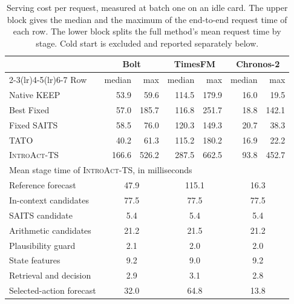 \documentclass{article}
\newcommand{\introact}{\textsc{IntroAct-TS}}
\begin{document}
\begin{table}[htbp]
  \caption{Serving cost per request, measured at batch one on an idle card. The upper block
  gives the median and the maximum of the end-to-end request time of each row. The lower block
  splits the full method's mean request time by stage. Cold start is excluded and reported
  separately below.}
  \label{tab:app-cost}
  \centering
  \small
  \setlength{\tabcolsep}{5pt}
  \begin{tabular*}{\textwidth}{@{\extracolsep{\fill}}lrrrrrr@{}}
    \toprule
    & \multicolumn{2}{c}{Bolt} & \multicolumn{2}{c}{TimesFM} & \multicolumn{2}{c}{Chronos-2} \\
    \cmidrule(lr){2-3}\cmidrule(lr){4-5}\cmidrule(lr){6-7}
    Row & median & max & median & max & median & max \\
    \midrule
    Native KEEP & 53.9 & 59.6 & 114.5 & 179.9 & 16.0 & 19.5 \\
    Best Fixed & 57.0 & 185.7 & 116.8 & 251.7 & 18.8 & 142.1 \\
    Fixed SAITS & 58.5 & 76.0 & 120.3 & 149.3 & 20.7 & 38.3 \\
    TATO & 40.2 & 61.3 & 115.2 & 180.2 & 16.9 & 22.2 \\
    \rowcolor{bestgray}\introact{} & 166.6 & 526.2 & 287.5 & 662.5 & 93.8 & 452.7 \\
    \midrule
    \multicolumn{7}{l}{Mean stage time of \introact{}, in milliseconds} \\
    Reference forecast & \multicolumn{2}{c}{47.9} & \multicolumn{2}{c}{115.1} & \multicolumn{2}{c}{16.3} \\
    In-context candidates & \multicolumn{2}{c}{77.5} & \multicolumn{2}{c}{77.5} & \multicolumn{2}{c}{77.5} \\
    SAITS candidate & \multicolumn{2}{c}{5.4} & \multicolumn{2}{c}{5.4} & \multicolumn{2}{c}{5.4} \\
    Arithmetic candidates & \multicolumn{2}{c}{21.2} & \multicolumn{2}{c}{21.5} & \multicolumn{2}{c}{21.2} \\
    Plausibility guard & \multicolumn{2}{c}{2.1} & \multicolumn{2}{c}{2.0} & \multicolumn{2}{c}{2.0} \\
    State features & \multicolumn{2}{c}{9.2} & \multicolumn{2}{c}{9.0} & \multicolumn{2}{c}{9.2} \\
    Retrieval and decision & \multicolumn{2}{c}{2.9} & \multicolumn{2}{c}{3.1} & \multicolumn{2}{c}{2.8} \\
    Selected-action forecast & \multicolumn{2}{c}{32.0} & \multicolumn{2}{c}{64.8} & \multicolumn{2}{c}{13.8} \\
    \bottomrule
  \end{tabular*}
\end{table}
\end{document}
